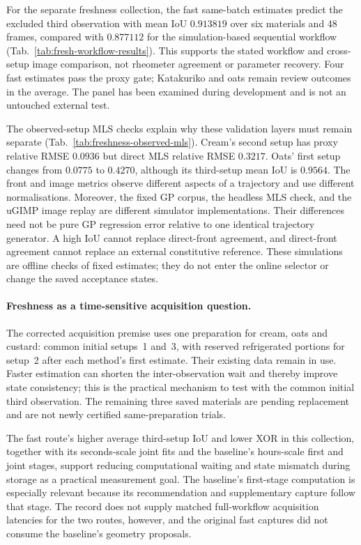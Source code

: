 For the separate freshness collection, the fast same-batch
estimates predict the excluded third observation with mean IoU
$0.913819$ over six materials and 48 frames, compared with $0.877112$
for the simulation-based sequential workflow
(Tab.~\ref{tab:fresh-workflow-results}). This supports the stated
workflow and cross-setup image comparison, not rheometer agreement
or parameter recovery. Four fast estimates pass the proxy gate;
Katakuriko and oats remain review outcomes in the average. The panel
has been examined during development and is not an untouched external test.

The observed-setup MLS checks explain why these validation layers
must remain separate (Tab.~\ref{tab:freshness-observed-mls}). Cream's
second setup has proxy relative RMSE $0.0936$ but direct MLS relative RMSE
$0.3217$. Oats' first setup changes from $0.0775$ to $0.4270$,
although its third-setup mean IoU is $0.9564$. The front and image
metrics observe different aspects of a trajectory and use different
normalisations. Moreover, the fixed GP corpus, the headless MLS
check, and the uGIMP image replay are different simulator
implementations. Their differences need not be pure GP regression
error relative to one identical trajectory generator. A high IoU
cannot replace direct-front agreement, and direct-front agreement
cannot replace an external constitutive reference. These simulations
are offline checks of fixed estimates; they do not enter the online
selector or change the saved acceptance states.

\paragraph{Freshness as a time-sensitive acquisition question.}
The corrected acquisition premise uses one preparation for cream, oats and custard: common initial setups~1 and~3, with reserved refrigerated portions for setup~2 after each method's first estimate. Their existing data remain in use. Faster estimation can shorten the inter-observation wait and thereby improve state consistency; this is the practical mechanism to test with the common initial third observation. The remaining three saved materials are pending replacement and are not newly certified same-preparation trials.

The fast route's higher average third-setup IoU and lower XOR in this
collection, together with its seconds-scale joint fits and the
baseline's hours-scale first and joint stages, support reducing
computational waiting and state mismatch during storage as a practical
measurement goal. The baseline's first-stage computation is especially
relevant because its recommendation and supplementary capture follow
that stage. The record does not supply matched full-workflow acquisition
latencies for the two routes, however, and the original fast captures
did not consume the baseline's geometry proposals.

